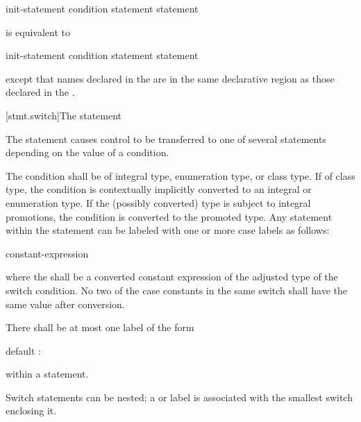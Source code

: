 \begin{ncbnf}
 init-statement condition \terminal{)} statement  statement
\end{ncbnf}

is equivalent to

\begin{ncbnftab}
\terminal{\{}\br
\>init-statement\br
\> condition \terminal{)} statement  statement\br
\terminal{\}}
\end{ncbnftab}

except that names declared in the  are in
the same declarative region as those declared in the
.

[stmt.switch]{The  statement}%

\pnum
The  statement causes control to be transferred to one of
several statements depending on the value of a condition.

\pnum
The condition shall be of integral type, enumeration type, or class
type. If of class type, the
condition is contextually implicitly converted to
an integral or enumeration type.
If the (possibly converted) type is subject to integral
promotions, the condition is converted
to the promoted type.
Any
statement within the  statement can be labeled with one or
more case labels as follows:

\begin{ncbnf}
%
 constant-expression \terminal{:}
\end{ncbnf}

where the  shall be
a converted constant expression of the
adjusted type of the switch condition. No two of the case constants in
the same switch shall have the same value after conversion.

\pnum
{}%
There shall be at most one label of the form

\begin{codeblock}
default :
\end{codeblock}

within a  statement.

\pnum
Switch statements can be nested; a  or  label
is associated with the smallest switch enclosing it.

